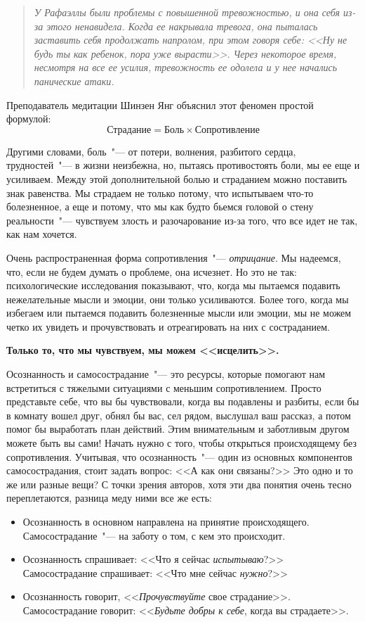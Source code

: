 \begin{quotation}
\textit{У Рафаэллы были проблемы с повышенной тревожностью, и она себя из-за этого ненавидела. Когда ее накрывала тревога, она пыталась заставить себя продолжать напролом, при этом говоря себе: <<Ну не будь ты как ребенок, пора уже вырасти>>. Через некоторое время, несмотря на все ее усилия, тревожность ее одолела и у нее начались панические атаки.}
\end{quotation}
	
Преподаватель медитации Шинзен Янг объяснил этот феномен простой формулой:
{\large \textbf{\[\text{Страдание} = \text{Боль} \times \text{Сопротивление}\]}}

Другими словами, боль~"--- от потери, волнения, разбитого сердца, трудностей~"--- в жизни неизбежна, но, пытаясь противостоять боли, мы ее еще и усиливаем. Между этой дополнительной болью и страданием можно поставить знак равенства. Мы страдаем не только потому, что испытываем что-то болезненное, а еще и потому, что мы как будто бьемся головой о стену реальности~"--- чувствуем злость и разочарование из-за того, что все идет не так, как нам хочется.

Очень распространенная форма сопротивления~"--- \textit{отрицание}. Мы надеемся, что, если не будем думать о проблеме, она исчезнет. Но это не так: психологические исследования показывают, что, когда мы пытаемся подавить нежелательные мысли и эмоции, они только усиливаются. Более того, когда мы избегаем или пытаемся подавить болезненные мысли или эмоции, мы не можем четко их увидеть и прочувствовать и отреагировать на них с состраданием. 

\begin{center}
	{\large \textbf{Только то, что мы чувствуем, мы можем <<исцелить>>.}}
\end{center}

Осознанность и самосострадание~"--- это ресурсы, которые помогают нам встретиться с тяжелыми ситуациями с меньшим сопротивлением. Просто представьте себе, что вы бы чувствовали, когда вы подавлены и разбиты, если бы в комнату вошел друг, обнял бы вас, сел рядом, выслушал ваш рассказ, а потом помог бы выработать план действий. Этим внимательным и заботливым другом можете быть вы сами! Начать нужно с того, чтобы открыться происходящему без сопротивления. 
Учитывая, что осознанность~"--- один из основных компонентов самосострадания, стоит задать вопрос: <<А как они связаны?>> Это одно и то же или разные вещи?
С точки зрения авторов, хотя эти два понятия очень тесно переплетаются, разница меду ними все же есть:
\begin{itemize}
	\item Осознанность в основном направлена на принятие происходящего. Самосострадание~"--- на заботу о том, с кем это происходит.
	\item Осознанность спрашивает: <<Что я сейчас \emph{испытываю}?>> Самосострадание спрашивает: <<Что мне сейчас \emph{нужно}?>> 
	\item Осознанность говорит, <<\emph{Прочувствуйте} свое страдание>>.  Самосострадание говорит: <<\emph{Будьте добры к себе}, когда вы страдаете>>.
\end{itemize}

